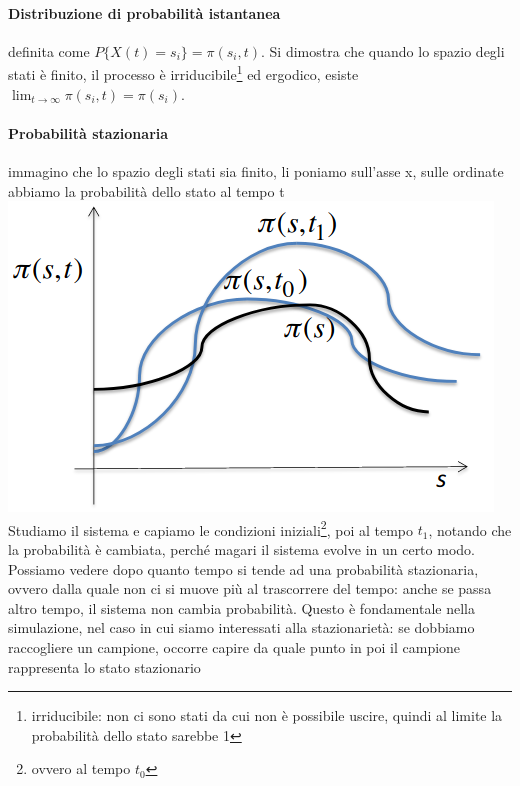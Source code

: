 \documentclass{article}
\begin{document}
\paragraph{Distribuzione di probabilità istantanea}definita come $P\{X(t) = s_i\} = \pi(s_i,t)$. Si dimostra che quando lo spazio degli stati è finito, il processo è irriducibile\footnote{irriducibile: non ci sono stati da cui non è possibile uscire, quindi al limite la probabilità dello stato sarebbe 1} ed ergodico, esiste $\lim_{t\rightarrow \infty} \pi(s_i,t) = \pi(s_i)$.
\paragraph{Probabilità stazionaria}immagino che lo spazio degli stati sia finito, li poniamo sull'asse x, sulle ordinate abbiamo la probabilità dello stato al tempo t\\
\includegraphics[scale=0.3]{images/PMCSN-2303.png}\\
Studiamo il sistema e capiamo le condizioni iniziali\footnote{ovvero al tempo $t_0$}, poi al tempo $t_1$, notando che la probabilità è cambiata, perché magari il sistema evolve in un certo modo. Possiamo vedere dopo quanto tempo si tende ad una probabilità stazionaria, ovvero dalla quale non ci si muove più al trascorrere del tempo: anche se passa altro tempo, il sistema non cambia probabilità. Questo è fondamentale nella simulazione, nel caso in cui siamo interessati alla stazionarietà: se dobbiamo raccogliere un campione, occorre capire da quale punto in poi il campione rappresenta lo stato stazionario
\end{document}

